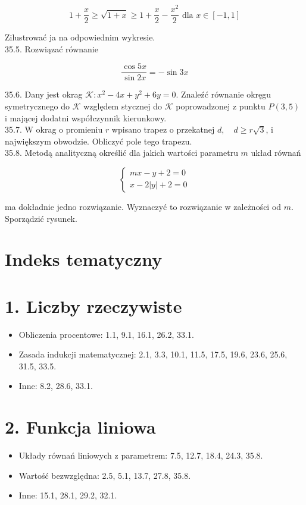 \documentclass[10pt]{article}
\begin{document}
$$
1+\frac{x}{2} \geq \sqrt{1+x} \geq 1+\frac{x}{2}-\frac{x^{2}}{2} \text { dla } x \in[-1,1]
$$

Zilustrować ja na odpowiednim wykresie.\\
35.5. Rozwiązać równanie

$$
\frac{\cos 5 x}{\sin 2 x}=-\sin 3 x
$$

35.6. Dany jest okrag $\mathcal{K}: x^{2}-4 x+y^{2}+6 y=0$. Znaleźć równanie okręgu symetrycznego do $\mathcal{K}$ względem stycznej do $\mathcal{K}$ poprowadzonej z punktu $P(3,5)$ i mającej dodatni współczynnik kierunkowy.\\
35.7. W okrag o promieniu $r$ wpisano trapez o przekatnej $d, \quad d \geq r \sqrt{3}$, i największym obwodzie. Obliczyć pole tego trapezu.\\
35.8. Metodą analityczną określić dla jakich wartości parametru $m$ układ równań

$$
\left\{\begin{array}{l}
m x-y+2=0 \\
x-2|y|+2=0
\end{array}\right.
$$

ma dokładnie jedno rozwiązanie. Wyznaczyć to rozwiązanie w zależności od $m$. Sporządzić rysunek.

\section*{Indeks tematyczny}
\section*{1. Liczby rzeczywiste}
\begin{itemize}
  \item Obliczenia procentowe: 1.1, 9.1, 16.1, 26.2, 33.1.
  \item Zasada indukcji matematycznej: 2.1, 3.3, 10.1, 11.5, 17.5, 19.6, 23.6, 25.6, 31.5, 33.5.
  \item Inne: 8.2, 28.6, 33.1.
\end{itemize}

\section*{2. Funkcja liniowa}
\begin{itemize}
  \item Układy równań liniowych z parametrem: 7.5, 12.7, 18.4, 24.3, 35.8.
  \item Wartość bezwzględna: 2.5, 5.1, 13.7, 27.8, 35.8.
  \item Inne: 15.1, 28.1, 29.2, 32.1.
\end{itemize}
\end{document}
